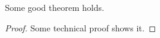 \documentclass{article}
\begin{document}
\begin{theoremrep}
Some good theorem holds.
\end{theoremrep}
\begin{proof}
Some technical proof shows it.
\end{proof}


\end{document}
